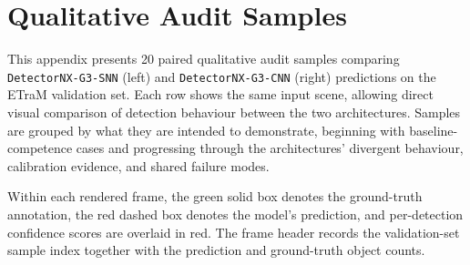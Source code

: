 \section{Qualitative Audit Samples}
\label{app:audit_samples}

This appendix presents 20 paired qualitative audit samples comparing \texttt{DetectorNX-G3-SNN} (left) and \texttt{DetectorNX-G3-CNN} (right) predictions on the ETraM validation set. Each row shows the same input scene, allowing direct visual comparison of detection behaviour between the two architectures. Samples are grouped by what they are intended to demonstrate, beginning with baseline-competence cases and progressing through the architectures' divergent behaviour, calibration evidence, and shared failure modes.

Within each rendered frame, the green solid box denotes the ground-truth annotation, the red dashed box denotes the model's prediction, and per-detection confidence scores are overlaid in red. The frame header records the validation-set sample index together with the prediction and ground-truth object counts.

\renewcommand{\arraystretch}{1.2}
\setlength{\tabcolsep}{4pt}

